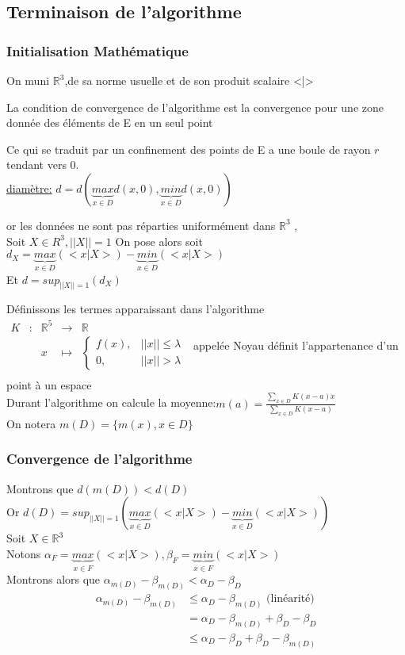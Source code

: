 \documentclass{beamer}
\newcommand{\fct}[5]
	{
	  \begin{array}{ccccc}
		#1 & : & #2 & \to & #3 \\
	    && #4 & \mapsto & #5 \\
	  \end{array}
	}
\newcommand{\ns}{\\ \indent \indent \vspace{0.15cm}}
\newcommand{\R}{\mathbb{R}}
\begin{document}
\subsection{Terminaison de l'algorithme}

\begin{frame}
\frametitle{Initialisation Mathématique}

On muni $\R^3$,de sa norme usuelle et de son produit scalaire <|>\ns

La condition de convergence de l'algorithme est la convergence pour une zone donnée des éléments de E en un seul point 

Ce qui se traduit par un confinement des points de E a une boule de rayon $r$ tendant vers 0.\\


\underline{diamètre:} $d = d(\underbrace{max}_{x \in D}d(x,0),\underbrace{min}_{x \in D}d(x,0))$

or les données ne sont pas réparties uniformément dans $\R^3$ ,\\
Soit $X \in R^3, ||X|| = 1$
On pose alors soit $d_X =  \underbrace{max}_{x \in D}(<x|X>)-\underbrace{min}_{x \in D}(<x|X>)$\\
Et $d = sup_{||X||=1}(d_X)$

\end{frame}

\begin{frame}
Définissons les termes apparaissant dans l'algorithme\\
$\fct{K}{\R^5}{\R}{x}{\begin{cases} f(x), & ||x|| \leq \lambda\\
0, & ||x|| > \lambda
\end{cases}}$  appelée Noyau définit l'appartenance d'un point à un espace\\
Durant l'algorithme on calcule la moyenne:$m(a) = \frac{\sum_{x\in D}K(x-a)x}{\sum_{x\in D}K(x-a)}$\\
On notera $m(D) = \lbrace m(x), x \in D \rbrace$
\end{frame}


\begin{frame}
\frametitle{Convergence de l'algorithme}
Montrons que $d(m(D))< d(D)$\\
Or $d(D) = sup_{||X||=1}(\underbrace{max}_{x \in D}(<x|X>)-\underbrace{min}_{x \in D}(<x|X>))$\\
Soit $X \in \R^3$\\
Notons $\alpha_F = \underbrace{max}_{x \in F}(<x|X>) , \beta_F = \underbrace{min}_{x \in F}(<x|X>)$\\
Montrons alors que $\alpha_{m(D)} - \beta_{m(D)} < \alpha_{D} -\beta_{D}$\\
\begin{align*}
\alpha_{m(D)} - \beta_{m(D)} &\leq \alpha_{D} - \beta_{m(D)} \text{ (linéarité)}\\
&= \alpha_{D} - \beta_{m(D)} + \beta_{D} - \beta_{D}\\
&\leq \alpha_{D}- \beta_{D} + \beta_{D} - \beta_{m(D)}\\
\end{align*}
\end{frame}
\end{document}
